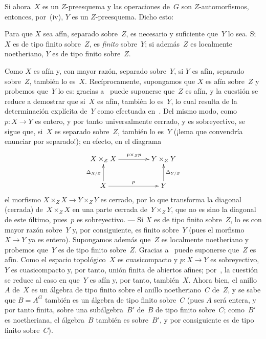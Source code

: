 Si ahora~$X$ es un $Z$-preesquema y las operaciones de~$G$ son
$Z$-automorfismos, entonces, por~(iv), $Y$ es un $Z$-preesquema. Dicho esto:

\begin{corollaire}
\label{V.1.5}
Para que $X$ sea afín, \resp separado sobre~$Z$, es necesario y suficiente
que~$Y$ lo sea. Si $X$ es de tipo finito sobre~$Z$, es \emph{finito}
sobre~$Y$; si además~$Z$ es localmente noetheriano, $Y$ es de tipo finito
sobre~$Z$.
\end{corollaire}

Como $X$ es afín y, con mayor razón, separado sobre~$Y$, si $Y$ es afín,
\resp separado sobre~$Z$, también lo es~$X$. Recíprocamente, supongamos que
$X$ es afín sobre~$Z$ y probemos que~$Y$ lo es: gracias a~ puede
suponerse que~$Z$ es afín, y la cuestión se reduce a demostrar que si~$X$ es
afín, también lo es~$Y$, lo cual resulta de la determinación explícita de~$Y$
como
efectuada en~.
Del mismo modo, como $p\colon{}X\to{}Y$ es entero, y por tanto
universalmente cerrado, y es sobreyectivo, se sigue que, si~$X$ es separado
sobre~$Z$, también lo es~$Y$ (¡lema que convendría enunciar por separado!);
en efecto, en el diagrama
$$
\xymatrix@C=1.5cm{ X \times_ZX\ar[r]^-{p\times_Zp} & Y\times_ZY \\
X \ar[u]^{\Delta_{X/Z}}\ar[r]^{p} & Y \ar[u]_{\Delta_{Y/Z}} }
$$
el morfismo $X\times_ZX\to Y\times_ZY$ es cerrado, por lo que transforma la
diagonal (cerrada) de~$X\times_ZX$ en una parte cerrada de~$Y\times_ZY$, que
no es sino la diagonal de este último, pues~$p$ es sobreyectivo.
--- Si $X$ es de tipo finito sobre~$Z$, lo es con mayor razón sobre~$Y$ y,
por consiguiente, es finito sobre~$Y$ (pues el morfismo $X\to Y$ ya es
entero).
Supongamos además que~$Z$ es localmente noetheriano y probemos que~$Y$ es de
tipo finito sobre~$Z$. Gracias a~ puede suponerse que~$Z$ es afín.
Como el espacio topológico~$X$ es cuasicompacto y
$p\colon X\to Y$ es sobreyectivo, $Y$ es
cuasicompacto y, por tanto, unión finita de abiertos
afines; por~, la cuestión se reduce al caso en que~$Y$ es afín y,
por tanto, también~$X$. Ahora bien, el anillo~$A$ de~$X$ es un álgebra de
tipo finito sobre el anillo noetheriano~$C$ de~$Z$, y se sabe que
$B=A^G$ también es un álgebra de tipo finito sobre~$C$ (pues $A$ será
entera, y por tanto finita, sobre una subálgebra~$B'$ de~$B$ de tipo finito
sobre~$C$; como~$B'$ es noetheriana, el álgebra~$B$ también es
sobre~$B'$, y por consiguiente es de tipo finito sobre~$C$).
